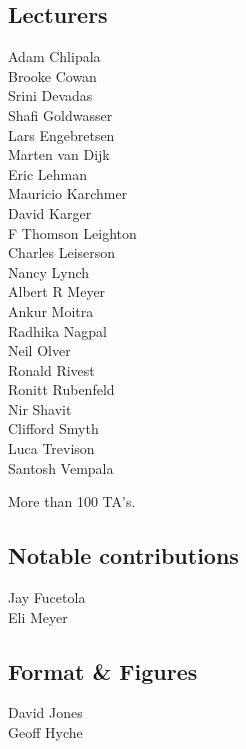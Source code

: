 \subsection*{Lecturers}

Adam Chlipala\\
Brooke Cowan\\
Srini Devadas\\
Shafi Goldwasser\\
Lars Engebretsen\\
Marten van Dijk\\
Eric Lehman\\
Mauricio Karchmer\\
David Karger\\
F Thomson Leighton\\
Charles Leiserson\\
Nancy Lynch\\
Albert R Meyer\\
Ankur Moitra\\
Radhika Nagpal\\
Neil Olver\\
Ronald Rivest\\
Ronitt Rubenfeld\\
Nir Shavit\\
Clifford Smyth\\
Luca Trevison\\
Santosh Vempala

More than 100 TA's.

\subsection*{Notable contributions}

Jay Fucetola\\
Eli Meyer

\subsection*{Format \& Figures}
David Jones\\
Geoff Hyche

\endinput
